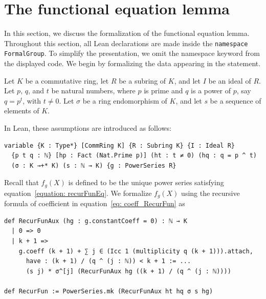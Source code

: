 \section{The functional equation lemma}

In this section, we discuss the formalization of the functional equation
lemma. Throughout this section, all Lean declarations are made inside the
\lstinline|namespace FormalGroup|.  To simplify the presentation, we omit
the namespace keyword from the displayed code.
We begin by formalizing the data appearing in the statement.

Let $K$ be a commutative ring, let $R$ be a subring of $K$, and let $I$
be an ideal of $R$.  Let $p$, $q$, and $t$ be natural numbers, where $p$
is prime and $q$ is a power of $p$, say $q = p ^ t$, with $t \neq 0$.
Let $\sigma$ be a ring endomorphism of $K$, and let $s$ be a sequence of
elements of $K$.

In Lean, these assumptions are introduced as follows:
\begin{lstlisting}
variable {K : Type*} [CommRing K] {R : Subring K} {I : Ideal R}
  {p t q : ℕ} [hp : Fact (Nat.Prime p)] (ht : t ≠ 0) (hq : q = p ^ t)
  (σ : K →+* K) (s : ℕ → K) {g : PowerSeries R}
\end{lstlisting}

Recall that $f_g(X)$ is defined to be
the unique power series satisfying equation~\eqref{equation: recurFunEq}.
We formalize $f_g(X)$ using the recursive formula of coefficient in
equation~\eqref{eq: coeff_RecurFun} as

\begin{lstlisting}
def RecurFunAux (hg : g.constantCoeff = 0) : ℕ → K
  | 0 => 0
  | k + 1 =>
    g.coeff (k + 1) + ∑ j ∈ (Icc 1 (multiplicity q (k + 1))).attach,
      have : (k + 1) / (q ^ (j : ℕ)) < k + 1 := ...
      (s j) * σ^[j] (RecurFunAux hg ((k + 1) / (q ^ (j : ℕ))))

def RecurFun := PowerSeries.mk (RecurFunAux ht hq σ s hg)
\end{lstlisting}


